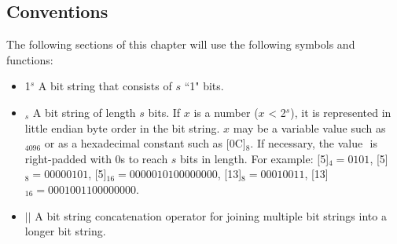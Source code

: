 \documentclass[main\_\_EN.tex]{subfiles}
\begin{document}
\subsection{Conventions}
The following sections of this chapter will use the following symbols and functions:
\begin{itemize}

\item
1\begin{math}^s\end{math}
\hspace{0.77cm}
A bit string that consists of \begin{math}s\end{math} ``1" bits.

    \item
        \begin{math}[x]_{s}\end{math}  \hspace{0.55cm}
        A bit string of length \begin{math}s\end{math} bits. If \begin{math}x\end{math} is a number (\begin{math}x\end{math} < 2\begin{math}^s\end{math}), it is represented in little endian byte order in the bit string. \begin{math}x\end{math} may be a variable value such as \begin{math}[Y]_{4096}\end{math} or as a hexadecimal constant such as [\hexprefix{}0C]\begin{math}_{8}\end{math}. If necessary, the value \begin{math}[x]\end{math} is right-padded with 0s to reach \begin{math}s\end{math} bits in length. For example: [\hexprefix{}5]\begin{math}_{4} = 0101\end{math}, [\hexprefix{}5]\begin{math}_{8} = 00000101\end{math}, [\hexprefix{}5]\begin{math}_{16} = 00000101 00000000\end{math}, [\hexprefix{}13]\begin{math}_{8} = 00010011\end{math}, [\hexprefix{}13]\begin{math}_{16} = 00010011 00000000\end{math}.

    \item
        \begin{math}{ || }\end{math}  \hspace{1.0cm}
            A bit string concatenation operator for joining multiple bit strings into a longer bit string.
\end{itemize}
\end{document}
